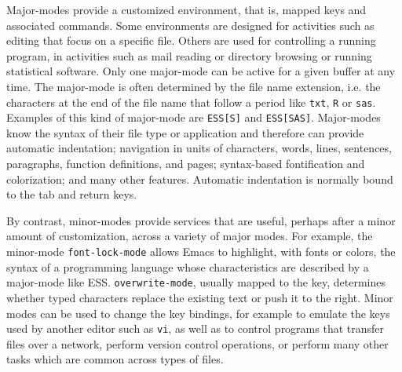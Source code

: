 \documentclass{article}
\newcommand{\stexttt}[1]{{\small\texttt{#1}}}
\newcommand{\ssf}[1]{{\small\sf{#1}}}
\begin{document}
Major-modes provide a %
customized environment, that is, mapped keys and associated commands.
Some environments are designed for activities such as editing that focus
on a specific file.  Others are used for controlling a running program,
in activities such as mail reading or directory browsing or running statistical
software.
Only one
major-mode can be active for a given buffer at any time.  The
major-mode is often determined by the file name extension, i.e. the
characters at the end of the file name that follow a period like
\stexttt{txt}, \stexttt{R} or \stexttt{sas}.  Examples of this kind of
major-mode are \stexttt{ESS[S]} and \stexttt{ESS[SAS]}.
Major-modes know the syntax of their file type or application and therefore can
provide automatic indentation; navigation in
units of characters, words, lines, sentences, paragraphs, function definitions,
and pages;
syntax-based fontification and colorization; and many other features.
Automatic indentation is normally bound to the tab and return keys.


By contrast, minor-modes provide services that are useful, perhaps
after a minor amount of customization, across a variety of major
modes.  For example, the minor-mode \stexttt{font-lock-mode} allows
Emacs to highlight, with fonts or colors, the syntax of a programming
language whose characteristics are described by a major-mode like
ESS\@.  \stexttt{overwrite-mode}, usually mapped to the \ssf{Insert}
key, determines whether typed characters replace the existing text or
push it to the right.  Minor modes can be used to change the key
bindings, for example to emulate the keys used by another editor such
as \stexttt{vi}, as well as to control programs that transfer files
over a network, perform version control operations, or perform many
other tasks which are common across types of files.
\end{document}
